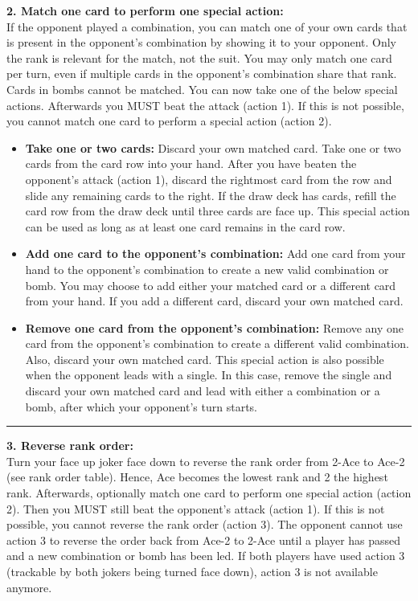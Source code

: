 \documentclass[11pt,a4paper]{article}
\begin{document}
\noindent\faEquals\quad \textbf{2. Match one card to perform one special action:}\\[0.3em]
If the opponent played a combination, you can match one of your own cards that is present in the opponent's combination by showing it to your opponent. Only the rank is relevant for the match, not the suit. You may only match one card per turn, even if multiple cards in the opponent's combination share that rank. Cards in bombs cannot be matched. You can now take one of the below special actions. Afterwards you MUST beat the attack (action 1). If this is not possible, you cannot match one card to perform a special action (action 2).
\begin{itemize}[leftmargin=1.5em, itemsep=0.5em]
    \item \textbf{Take one or two cards:} Discard your own matched card. Take one or two cards from the card row into your hand. After you have beaten the opponent's attack (action 1), discard the rightmost card from the row and slide any remaining cards to the right. If the draw deck has cards, refill the card row from the draw deck until three cards are face up. This special action can be used as long as at least one card remains in the card row.
    \item \textbf{Add one card to the opponent's combination:} Add one card from your hand to the opponent's combination to create a new valid combination or bomb. You may choose to add either your matched card or a different card from your hand. If you add a different card, discard your own matched card.
    \item \textbf{Remove one card from the opponent's combination:} Remove any one card from the opponent's combination to create a different valid combination. Also, discard your own matched card. This special action is also possible when the opponent leads with a single. In this case, remove the single and discard your own matched card and lead with either a combination or a bomb, after which your opponent's turn starts.
\end{itemize}

\bigskip
\noindent\rule{0.3\columnwidth}{0.2pt}
\bigskip

\noindent\faSync\quad \textbf{3. Reverse rank order:}\\[0.3em]
Turn your face up joker face down to reverse the rank order from 2-Ace to Ace-2 (see rank order table). Hence, Ace becomes the lowest rank and 2 the highest rank. Afterwards, optionally match one card to perform one special action (action 2). Then you MUST still beat the opponent's attack (action 1). If this is not possible, you cannot reverse the rank order (action 3). The opponent cannot use action 3 to reverse the order back from Ace-2 to 2-Ace until a player has passed and a new combination or bomb has been led. If both players have used action 3 (trackable by both jokers being turned face down), action 3 is not available anymore.
\end{document}

